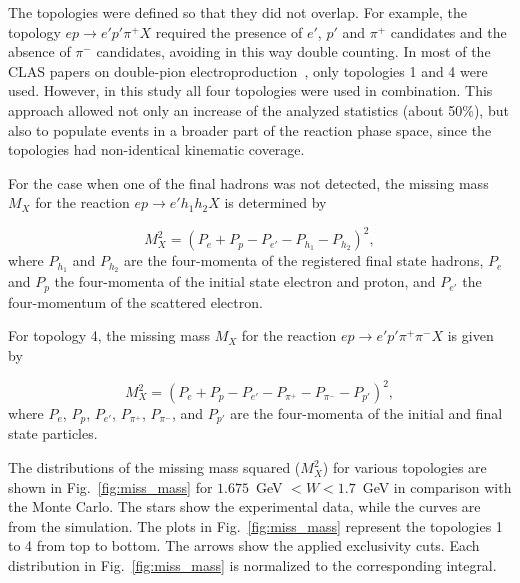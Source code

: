 \documentclass[prc,twocolumn,superscriptaddress,showpacs,amssymb,amsmath,amsfonts,aps,nofootinbib]{revtex4-1}
\begin{document}
The topologies were defined so that they did not overlap. For example, the topology $e p \rightarrow e' p' \pi^{+} X$ required the presence of $e'$, $p'$ and $\pi^{+}$ candidates and the absence of $\pi^{-}$ candidates, avoiding in this way double counting. In most of the CLAS papers on double-pion electroproduction~\cite{Isupov:2017lnd,Ripani:2002ss,Fedotov:2008aa}, only topologies 1 and 4 were used. However, in this study all four topologies were used in combination. 
This approach allowed not only an increase of the analyzed statistics (about 50\%), but also to populate events in a broader part of the reaction phase space, since the topologies had non-identical kinematic coverage. 






For the case when one of the final hadrons was not detected, the missing mass $M_{X}$ for the reaction $e p \rightarrow e' h_1 h_2 X$ is determined by 



\begin{equation}
M_{X}^{2} = (P_{e} + P_{p} -P_{e'} - P_{h_1} - P_{h_2})^{2},
\label{eg:miss_mass}
\end{equation} 
where $P_{h_1}$ and $P_{h_2}$ are the four-momenta of the registered final state hadrons, $P_{e}$ and $P_{p}$ the four-momenta of the initial state electron and proton, and $P_{e'}$ the four-momentum of the scattered electron.

For topology 4, the missing mass $M_{X}$ for the reaction $e p \rightarrow e' p' \pi^+ \pi^- X$ is given by

\begin{equation}
M_{X}^{2} = (P_{e} + P_{p} -P_{e'} - P_{\pi^+} - P_{\pi^-} - P_{p'})^{2},
\label{eg:miss_mass_zero}
\end{equation} 
where $P_{e}$, $P_{p}$, $P_{e'}$, $P_{\pi^+}$, $P_{\pi^-}$,  and $P_{p'}$  are the four-momenta of the initial and final state particles.

 


The distributions of the missing mass squared ($M_{X}^{2}$) for various topologies are shown in Fig.~\ref{fig:miss_mass} for $1.675$~GeV $< W < 1.7$~GeV in comparison with the Monte Carlo. The stars show the experimental data, while the curves are from the simulation.
The plots in Fig.~\ref{fig:miss_mass} represent the topologies 1 to 4 from top to bottom. The arrows show the applied exclusivity cuts. 
Each distribution in Fig.~\ref{fig:miss_mass} is normalized to the corresponding integral.
\end{document}
